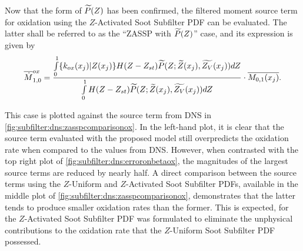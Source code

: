 Now that the form of $\pz$ has been confirmed, the filtered moment source term for oxidation using the $Z$-Activated Soot Subfilter PDF can be evaluated. The latter shall be referred to as the ``ZASSP with $\pz$'' case, and its expression is given by
\begin{equation}\label{eq:subfilter:dns:mzasspwithpz}
  \fst[M]{1,0}^{ox} = \frac{\int\limits_0^1 \{ k_{ox}(x_j)|Z(x_j) \}H(Z - Z_{st})\tf{P}(Z; \tf{Z}(x_j),\tf{Z_V}(x_j)) dZ}{\int\limits_0^1 H(Z - Z_{st})\tf{P}(Z; \tf{Z}(x_j),\tf{Z_V}(x_j)) dZ} \cdot \mean{M_{0,1}(x_j)}.
\end{equation}

This case is plotted against the source term from DNS in \cref{fig:subfilter:dns:zasspcomparisonox}. In the left-hand plot, it is clear that the source term evaluated with the proposed model still overpredicts the oxidation rate when compared to the values from DNS. However, when contrasted with the top right plot of \cref{fig:subfilter:dns:erroronbetaox}, the magnitudes of the largest source terms are reduced by nearly half. A direct comparison between the source terms using the $Z$-Uniform and $Z$-Activated Soot Subfilter PDFs, available in the middle plot of \cref{fig:subfilter:dns:zasspcomparisonox}, demonstrates that the latter tends to produce smaller oxidation rates than the former. This is expected, for the $Z$-Activated Soot Subfilter PDF was formulated to eliminate the unphysical contributions to the oxidation rate that the $Z$-Uniform Soot Subfilter PDF possessed.

